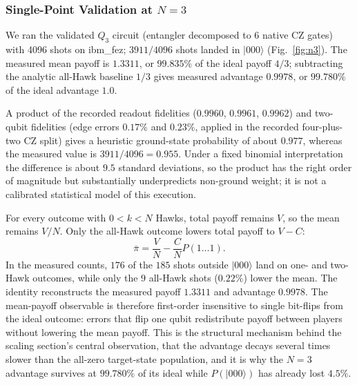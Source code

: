 \documentclass[conference,letterpaper,10pt]{IEEEtran}
\newcommand{\ket}[1]{\ensuremath{|#1\rangle}}
\begin{document}
\subsubsection{Single-Point Validation at \texorpdfstring{$N=3$}{N=3}}
We ran the validated $Q_3$ circuit (entangler decomposed to 6 native CZ gates)
with 4096 shots on ibm\_fez; $3911/4096$ shots landed in $\ket{000}$
(Fig.~\ref{fig:n3}). The measured mean payoff is $1.3311$, or
$99.835\%$ of the ideal payoff $4/3$; subtracting the analytic all-Hawk
baseline $1/3$ gives measured advantage $0.9978$, or $99.780\%$ of the ideal
advantage $1.0$.

A product of the recorded readout fidelities ($0.9960$, $0.9961$, $0.9962$)
and two-qubit fidelities (edge errors $0.17\%$ and $0.23\%$, applied in the
recorded four-plus-two CZ split) gives a heuristic ground-state
probability of about $0.977$, whereas the measured value is
$3911/4096=0.955$. Under a fixed binomial interpretation the difference is
about $9.5$ standard deviations, so the product has the right order of
magnitude but substantially underpredicts non-ground weight; it is not a
calibrated statistical model of this execution.

For every outcome with $0<k<N$ Hawks, total payoff remains $V$, so the mean
remains $V/N$. Only the all-Hawk outcome lowers total payoff to $V-C$:
\begin{equation}
\overline{\pi}=\frac{V}{N}-\frac{C}{N}P(1\ldots1).
\end{equation}
In the measured counts, $176$ of the $185$ shots outside $\ket{000}$ land on
one- and two-Hawk outcomes, while only the $9$ all-Hawk shots ($0.22\%$) lower
the mean. The identity reconstructs the measured payoff $1.3311$ and advantage
$0.9978$.
The mean-payoff observable is therefore first-order insensitive to single
bit-flips from the ideal outcome: errors that flip one qubit redistribute
payoff between players without lowering the mean payoff. This is the
structural mechanism behind the scaling section's central observation, that
the advantage decays several times slower than the all-zero target-state
population, and it is why the
$N=3$ advantage survives at $99.780\%$ of its ideal while
$P(\ket{000})$ has already lost $4.5\%$.
\end{document}
